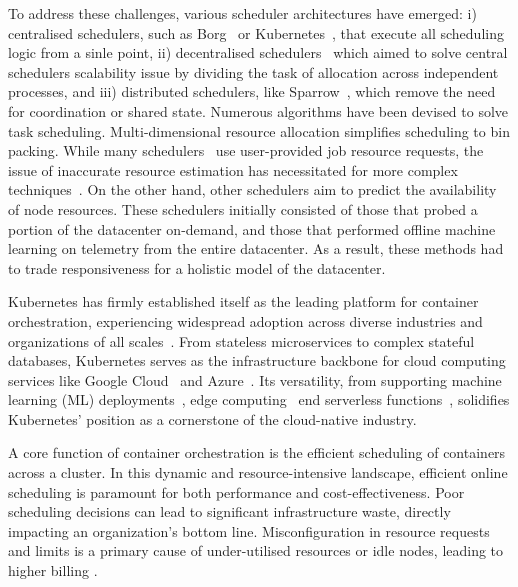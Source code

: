 To address these challenges, various scheduler architectures have emerged:
i) centralised schedulers, such as Borg~\cite{} or Kubernetes~\cite{}, that execute all scheduling
logic from a sinle point, ii) decentralised schedulers~\cite{apollo} which aimed to solve
central schedulers scalability issue by dividing the task of allocation across
independent processes, and iii) distributed schedulers, like Sparrow~\cite{},
which remove the need for coordination or shared state. Numerous algorithms have
been devised to solve task scheduling. Multi-dimensional
resource allocation simplifies scheduling to bin packing. While many
schedulers~\cite{borg, kube} use user-provided job resource requests, the issue
of inaccurate resource estimation has necessitated for more complex
techniques~\cite{}. On the other hand, other schedulers aim to predict the
availability of node resources. These schedulers initially consisted of those
that probed a portion of the datacenter on-demand, and those that performed
offline machine learning on telemetry from the entire datacenter. As a result,
these methods had to trade responsiveness for a holistic model of the datacenter.

Kubernetes has firmly established itself as the leading platform for container
orchestration, experiencing widespread adoption across diverse industries and
organizations of all scales~\cite{kubernetes-adoption-statistics}. From
stateless microservices to complex stateful databases, Kubernetes serves as the
infrastructure backbone for cloud computing services like Google
Cloud~\cite{google-gke} and Azure~\cite{azure-aks}. Its versatility, from
supporting machine learning (ML) deployments~\cite{kubernetes-ai}, edge
computing~\cite{cloudraft} end serverless functions~\cite{knative, openwhisk},
solidifies Kubernetes' position as a cornerstone of the cloud-native industry.

A core function of container orchestration is the efficient scheduling of
containers across a cluster. In this dynamic and resource-intensive
landscape, efficient online scheduling is paramount for both performance and
cost-effectiveness. Poor scheduling decisions can lead to significant
infrastructure waste, directly impacting an organization's bottom line.
Misconfiguration in resource requests and limits is a primary cause of
under-utilised resources or idle nodes, leading to higher billing
\cite{cost-strategies,
bin-packing-and-cost-savings-in-kubernetes-clusters-on-aws}.

